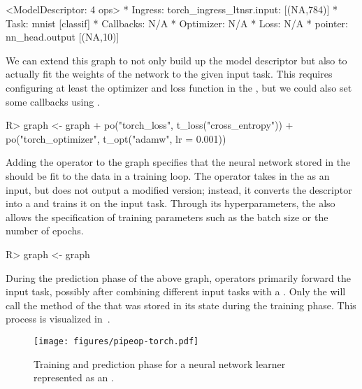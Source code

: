 \documentclass[article]{jss}
\theoremstyle{definition}
\begin{document}
\begin{CodeOutput}
<ModelDescriptor: 4 ops>
* Ingress:  torch_ingress_ltnsr.input: [(NA,784)]
* Task:  mnist [classif]
* Callbacks:  N/A
* Optimizer:  N/A
* Loss:  N/A
* pointer:  nn_head.output [(NA,10)]
\end{CodeOutput}

We can extend this graph to not only build up the model descriptor but also to actually fit the weights of the network to the given input task.
This requires configuring at least the optimizer and loss function in the , but we could also set some callbacks using .

\begin{CodeInput}
R> graph <- graph %
+    po("torch_loss", t_loss("cross_entropy")) %
+    po("torch_optimizer", t_opt("adamw", lr = 0.001))
\end{CodeInput}

Adding the  operator to the graph specifies that the neural network stored in the  should be fit to the data in a training loop.
The operator takes in the  as an input, but does not output a modified version; instead, it converts the descriptor into a  and trains it on the input task.
Through its hyperparameters, the  also allows the specification of training parameters such as the batch size or the number of epochs.

\begin{CodeInput}
R> graph <- graph %
\end{CodeInput}

During the prediction phase of the above graph,   operators primarily forward the input task, possibly after combining different input tasks with a .
Only the  will call the  method of the  that was stored in its state during the training phase.
This process is visualized in~.

\begin{figure}
    \centering
    \texttt{[image: figures/pipeop-torch.pdf]}
    \caption{Training and prediction phase for a neural network learner represented as an .}
    \label{fig:pipeop-torch}
\end{figure}
\end{document}
